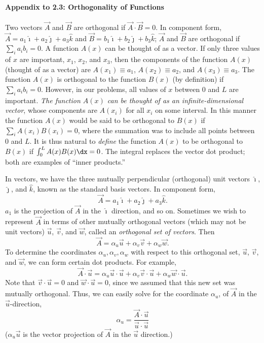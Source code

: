 \paragraph{Appendix to 2.3: Orthogonality of Functions}

Two vectors $\vec{A}$ and $\vec{B}$ are orthogonal if $\vec{A}\cdot\vec{B} = 0$. In component form, $\vec{A} = a_1\hat{\imath} + a_2\hat{\jmath} + a_3\hat{k}$ and $\vec{B} = b_1\hat{\imath} + b_2\hat{\jmath} + b_3\hat{k}$; $\vec{A}$ and $\vec{B}$ are orthogonal if $\sum_i a_i b_i = 0$. A function $A(x)$ can be thought of as a vector. If only three values of $x$ are important, $x_1$, $x_2$, and $x_3$, then the components of the function $A(x)$ (thought of as a vector) are $A(x_1) \equiv a_1$, $A(x_2) \equiv a_2$, and $A(x_3) \equiv a_3$. The function $A(x)$ is orthogonal to the function $B(x)$ (by definition) if $\sum_i a_i b_i = 0$. However, in our problems, all values of $x$ between $0$ and $L$ are important. \emph{The function $A(x)$ can be thought of as an infinite-dimensional vector}, whose components are $A(x_i)$ for all $x_i$ on some interval. In this manner the function $A(x)$ would be said to be orthogonal to $B(x)$ if $\sum_i A(x_i)B(x_i) = 0$, where the summation was to include all points between $0$ and $L$. It is thus natural to \emph{define} the function $A(x)$ to be orthogonal to $B(x)$ if $\int_0^L A(x)B(x)\dx = 0$. The integral replaces the vector dot product; both are examples of ``inner products.''

In vectors, we have the three mutually perpendicular (orthogonal) unit vectors $\hat{\imath}$, $\hat{\jmath}$, and $\hat{k}$, known as the standard basis vectors. In component form,
\[
\vec{A} = a_1\hat{\imath} + a_2\hat{\jmath} + a_3\hat{k}.
\]
$a_1$ is the projection of $\vec{A}$ in the $\hat{\imath}$ direction, and so on. Sometimes we wish to represent $\vec{A}$ in terms of other mutually orthogonal vectors (which may not be unit vectors) $\vec{u}$, $\vec{v}$, and $\vec{w}$, called an \emph{orthogonal set of vectors}. Then
\[
\vec{A} = \alpha_u \vec{u} + \alpha_v \vec{v} + \alpha_w \vec{w}.
\]
To determine the coordinates $\alpha_u, \alpha_v, \alpha_w$ with respect to this orthogonal set, $\vec{u}$, $\vec{v}$, and $\vec{w}$, we can form certain dot products. For example,
\[
\vec{A}\cdot\vec{u} = \alpha_u\vec{u}\cdot\vec{u} + \alpha_v\vec{v}\cdot\vec{u} + \alpha_w\vec{w}\cdot\vec{u}.
\]
Note that $\vec{v}\cdot\vec{u} = 0$ and $\vec{w}\cdot\vec{u} = 0$, since we assumed that this new set was mutually orthogonal. Thus, we can easily solve for the coordinate $\alpha_u$, of $\vec{A}$ in the $\vec{u}$-direction,
\begin{equation}
\label{eq:2.3.45}
\alpha_u = \frac{\vec{A}\cdot\vec{u}}{\vec{u}\cdot\vec{u}}
\end{equation}
($\alpha_u\vec{u}$ is the vector projection of $\vec{A}$ in the $\vec{u}$ direction.)

